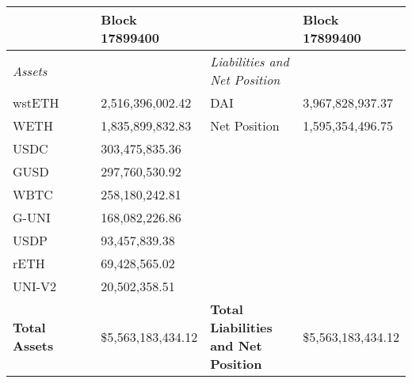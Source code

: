 
\begin{longtable}{@{}p{0.25\linewidth}p{0.25\linewidth}p{0.25\linewidth}p{0.25\linewidth}@{}}

\toprule


& Block 17899400 & & Block 17899400 \\

\midrule
\textit{Assets} & & \textit{Liabilities and Net Position} \\
wstETH & 2,516,396,002.42 & DAI &3,967,828,937.37 \\
WETH & 1,835,899,832.83 & Net Position &1,595,354,496.75 \\
USDC & 303,475,835.36 & & \\
GUSD & 297,760,530.92 & & \\
WBTC & 258,180,242.81 & & \\
G-UNI & 168,082,226.86 & & \\
USDP & 93,457,839.38 & & \\
rETH & 69,428,565.02 & & \\
UNI-V2 & 20,502,358.51 & & \\

\midrule

\textbf{Total Assets} & \$5,563,183,434.12 & \textbf{Total Liabilities and Net Position} & \$5,563,183,434.12 \\

\bottomrule

\end{longtable}
